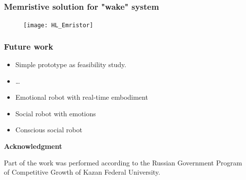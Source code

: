 \documentclass[12pt, aspectratio=169]{beamer}
\begin{document}


\begin{frame}
\frametitle{Memristive solution for "wake" system}
\begin{figure}
\texttt{[image: HL\_Emristor]}
\end{figure}
\end{frame}




\begin{frame}
  \frametitle{Future work}
  
\begin{itemize}
  \item Simple prototype as feasibility study.
  \item \ldots\
  \item Emotional robot with real-time embodiment
  \item Social robot with emotions
  \item Conscious social robot
\end{itemize}

\textbf{Acknowledgment}

Part of the work was performed according to the Russian Government Program of Competitive Growth of Kazan Federal University.

\end{frame}



\end{document}
